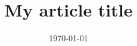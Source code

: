 \documentclass{mds-article}
\title{My article title}
\date{\today}		  %
\begin{document}
\Blinddocument
\end{document}
